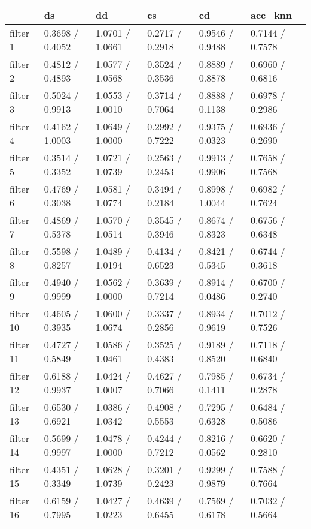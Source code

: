 \begin{tabular}{llllll}
\toprule
{} &               ds &               dd &               cs &               cd &          acc\_knn \\
\midrule
filter 1  &  0.3698 / 0.4052 &  1.0701 / 1.0661 &  0.2717 / 0.2918 &  0.9546 / 0.9488 &  0.7144 / 0.7578 \\
filter 2  &  0.4812 / 0.4893 &  1.0577 / 1.0568 &  0.3524 / 0.3536 &  0.8889 / 0.8878 &  0.6960 / 0.6816 \\
filter 3  &  0.5024 / 0.9913 &  1.0553 / 1.0010 &  0.3714 / 0.7064 &  0.8888 / 0.1138 &  0.6978 / 0.2986 \\
filter 4  &  0.4162 / 1.0003 &  1.0649 / 1.0000 &  0.2992 / 0.7222 &  0.9375 / 0.0323 &  0.6936 / 0.2690 \\
filter 5  &  0.3514 / 0.3352 &  1.0721 / 1.0739 &  0.2563 / 0.2453 &  0.9913 / 0.9906 &  0.7658 / 0.7568 \\
filter 6  &  0.4769 / 0.3038 &  1.0581 / 1.0774 &  0.3494 / 0.2184 &  0.8998 / 1.0044 &  0.6982 / 0.7624 \\
filter 7  &  0.4869 / 0.5378 &  1.0570 / 1.0514 &  0.3545 / 0.3946 &  0.8674 / 0.8323 &  0.6756 / 0.6348 \\
filter 8  &  0.5598 / 0.8257 &  1.0489 / 1.0194 &  0.4134 / 0.6523 &  0.8421 / 0.5345 &  0.6744 / 0.3618 \\
filter 9  &  0.4940 / 0.9999 &  1.0562 / 1.0000 &  0.3639 / 0.7214 &  0.8914 / 0.0486 &  0.6700 / 0.2740 \\
filter 10 &  0.4605 / 0.3935 &  1.0600 / 1.0674 &  0.3337 / 0.2856 &  0.8934 / 0.9619 &  0.7012 / 0.7526 \\
filter 11 &  0.4727 / 0.5849 &  1.0586 / 1.0461 &  0.3525 / 0.4383 &  0.9189 / 0.8520 &  0.7118 / 0.6840 \\
filter 12 &  0.6188 / 0.9937 &  1.0424 / 1.0007 &  0.4627 / 0.7066 &  0.7985 / 0.1411 &  0.6734 / 0.2878 \\
filter 13 &  0.6530 / 0.6921 &  1.0386 / 1.0342 &  0.4908 / 0.5553 &  0.7295 / 0.6328 &  0.6484 / 0.5086 \\
filter 14 &  0.5699 / 0.9997 &  1.0478 / 1.0000 &  0.4244 / 0.7212 &  0.8216 / 0.0562 &  0.6620 / 0.2810 \\
filter 15 &  0.4351 / 0.3349 &  1.0628 / 1.0739 &  0.3201 / 0.2423 &  0.9299 / 0.9879 &  0.7588 / 0.7664 \\
filter 16 &  0.6159 / 0.7995 &  1.0427 / 1.0223 &  0.4639 / 0.6455 &  0.7569 / 0.6178 &  0.7032 / 0.5664 \\
\bottomrule
\end{tabular}
